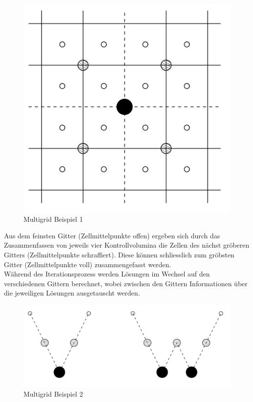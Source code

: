 \documentclass[a4paper]{scrartcl}
\begin{document}
\begin{figure}[h!]
\begin{center}
\includegraphics[scale=0.3]{images/multigrid1.png}
\caption{Multigrid Beispiel 1}
\label{fig:Multigrid1}
\end{center}
\end{figure}

Aus dem feinsten Gitter (Zellmittelpunkte offen) ergeben sich durch das
Zusammenfassen von jeweils vier Kontrollvolumina die Zellen des nächst gröberen
Gitters (Zellmittelpunkte schraffiert). Diese können schliesslich zum gröbsten
Gitter (Zellmittelpunkte voll) zusammengefasst werden.
\\
Während des Iterationsprozess werden Lösungen im Wechsel auf den verschiedenen
Gittern berechnet, wobei zwischen den Gittern Informationen über die jeweiligen
Lösungen ausgetauscht werden.
\\
\begin{figure}[h!]
\begin{center}
\includegraphics[scale=0.3]{images/multigrid2.png}
\caption{Multigrid Beispiel 2}
\label{fig:Multigrid2}
\end{center}
\end{figure}
\end{document}
